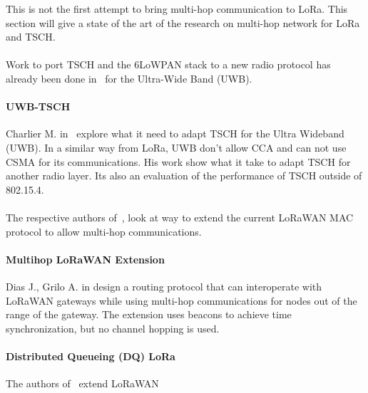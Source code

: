 This is not the first attempt to bring multi-hop communication to LoRa.
This section will give a state of the art of the research on
multi-hop network for LoRa and TSCH.

\paragraph{}

Work to port TSCH and the 6LoWPAN stack to a new radio protocol has already 
been done in~\cite{uwbtsch} for the Ultra-Wide Band (UWB).


\paragraph{UWB-TSCH}

Charlier M. in~\cite{uwbtsch} explore what it need to adapt TSCH for the Ultra
Wideband (UWB). 
In a similar way from LoRa, UWB don't allow CCA and can not use CSMA for its 
communications.
His work show what it take to adapt TSCH for another radio layer. 
Its also an evaluation of the performance of TSCH outside of 802.15.4.

\paragraph{}

The respective authors of~\cite{DIAS2018424, 8856256}, look at way to extend
the current LoRaWAN MAC protocol to allow multi-hop communications.

\paragraph{Multihop LoRaWAN Extension} Dias J., Grilo A. in \cite{DIAS2018424}
design a routing protocol that can interoperate with LoRaWAN gateways while
using multi-hop communications for nodes out of the range of the gateway.  
The extension uses beacons to achieve time synchronization, but no channel
hopping is used.

\paragraph{Distributed Queueing (DQ) LoRa}

The authors of~\cite{8856256} extend LoRaWAN

